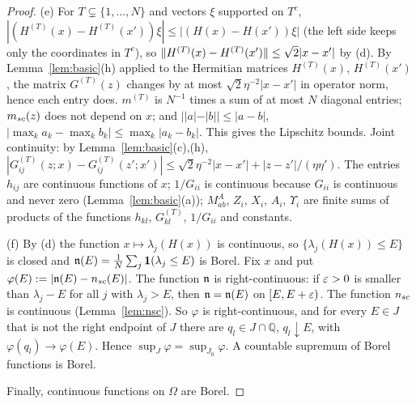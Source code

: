 \begin{proof}
(e) For $T\subsetneq\{1,\dots,N\}$ and vectors $\xi$ supported on $T^c$, $|(H^{(T)}(x)-H^{(T)}(x'))\xi|\le|(H(x)-H(x'))\xi|$ (the left side keeps only the coordinates in $T^c$), so $\|H^{(T)}(x)-H^{(T)}(x')\|\le\sqrt2|x-x'|$ by (d).
By Lemma~\ref{lem:basic}(h) applied to the Hermitian matrices $H^{(T)}(x)$, $H^{(T)}(x')$, the matrix $G^{(T)}(z)$ changes by at most $\sqrt2\eta^{-2}|x-x'|$ in operator norm, hence each entry does.
$m^{(T)}$ is $N^{-1}$ times a sum of at most $N$ diagonal entries; $m_{sc}(z)$ does not depend on $x$; and $||a|-|b||\le|a-b|$, $|\max_ka_k-\max_kb_k|\le\max_k|a_k-b_k|$. This gives the Lipschitz bounds.
Joint continuity: by Lemma~\ref{lem:basic}(c),(h), $|G^{(T)}_{ij}(z;x)-G^{(T)}_{ij}(z';x')|\le\sqrt2\eta^{-2}|x-x'|+|z-z'|/(\eta\eta')$.
The entries $h_{ij}$ are continuous functions of $x$; $1/G_{ii}$ is continuous because $G_{ii}$ is continuous and never zero (Lemma~\ref{lem:basic}(a)); $M^A_{ab}$, $Z_i$, $X_i$, $A_i$, $\Upsilon_i$ are finite sums of products of the functions $h_{kl}$, $G^{(T)}_{kl}$, $1/G_{ii}$ and constants.

(f) By (d) the function $x\mapsto\lambda_j(H(x))$ is continuous, so $\{\lambda_j(H(x))\le E\}$ is closed and $\mathfrak{n}(E)=\frac1N\sum_j\mathbf{1}(\lambda_j\le E)$ is Borel.
Fix $x$ and put $\varphi(E):=|\mathfrak{n}(E)-n_{sc}(E)|$. The function $\mathfrak{n}$ is right-continuous: if $\varepsilon>0$ is smaller than $\lambda_j-E$ for all $j$ with $\lambda_j>E$, then $\mathfrak{n}=\mathfrak{n}(E)$ on $[E,E+\varepsilon)$.
The function $n_{sc}$ is continuous (Lemma~\ref{lem:nsc}). So $\varphi$ is right-continuous, and for every $E\in J$ that is not the right endpoint of $J$ there are $q_l\in J\cap\mathbb Q$, $q_l\downarrow E$, with $\varphi(q_l)\to\varphi(E)$.
Hence $\sup_J\varphi=\sup_{J_0}\varphi$. A countable supremum of Borel functions is Borel.

Finally, continuous functions on $\Omega$ are Borel.
\end{proof}

